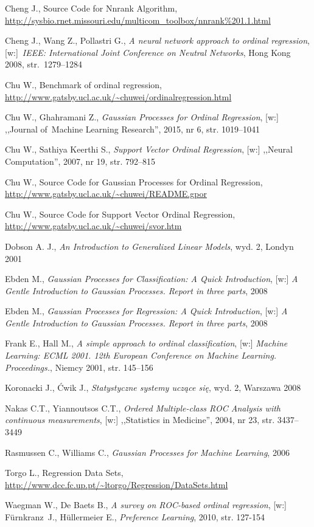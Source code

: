 \documentclass{mini}
\begin{document}
\begin{thebibliography}{9}
	
	 Cheng J., Source Code for Nnrank Algorithm, \url{http://sysbio.rnet.missouri.edu/multicom_toolbox/nnrank\%201.1.html}	
	
	 Cheng J., Wang Z., Pollastri G., \emph{A neural network approach to ordinal regression}, [w:]~\emph{\mbox{IEEE:} International Joint Conference on Neutral Networks}, Hong Kong 2008, str.~1279--1284	
	
	 Chu W., Benchmark of ordinal regression, \url{http://www.gatsby.ucl.ac.uk/~chuwei/ordinalregression.html}	

	 Chu W., Ghahramani Z., \emph{Gaussian Processes for Ordinal Regression}, [w:] ,,Journal of~Machine Learning Research'', 2015, nr 6, str. 1019--1041	
	
	 Chu W., Sathiya Keerthi S., \emph{Support Vector Ordinal Regression}, [w:] ,,Neural Computation'', 2007, nr 19, str. 792--815 	
	
	 Chu W., Source Code for Gaussian Processes for Ordinal Regression, \url{http://www.gatsby.ucl.ac.uk/~chuwei/README.gpor}	
	
	 Chu W., Source Code for Support Vector Ordinal Regression, \url{http://www.gatsby.ucl.ac.uk/~chuwei/svor.htm}		
	
	 Dobson A. J., \emph{An Introduction to Generalized Linear Models}, wyd. 2, Londyn 2001
	
	 Ebden M., \emph{Gaussian Processes for Classification: A Quick Introduction}, [w:] \emph{A Gentle Introduction to Gaussian Processes. Report in three parts}, 2008	
	
	 Ebden M., \emph{Gaussian Processes for Regression: A Quick Introduction}, [w:] \emph{A Gentle Introduction to Gaussian Processes. Report in three parts}, 2008	
	
	 Frank E., Hall M., \emph{A simple approach to ordinal classification}, [w:] \emph{Machine Learning: ECML 2001. 12th European Conference on Machine Learning. Proceedings.}, Niemcy 2001, str. 145--156

	 Koronacki J., Ćwik J., \emph{Statystyczne systemy uczące się}, wyd. 2, Warszawa 2008 

	 Nakas C.T., Yiannoutsos C.T., \emph{Ordered Multiple-class ROC Analysis with continuous measurements}, [w:] ,,Statistics in Medicine'', 2004, nr 23, str. 3437--3449
		
	 Rasmussen C., Williams C., \emph{Gaussian Processes for Machine Learning}, 2006
	
	 Torgo L., Regression Data Sets, \url{http://www.dcc.fc.up.pt/~ltorgo/Regression/DataSets.html}	
	
	 Waegman W., De Baets B., \emph{A survey on ROC-based ordinal regression}, [w:] Fürnkranz~J., Hüllermeier E., \emph{Preference Learning}, 2010, str. 127-154
	

\end{thebibliography}


\makestatement
\end{document}
